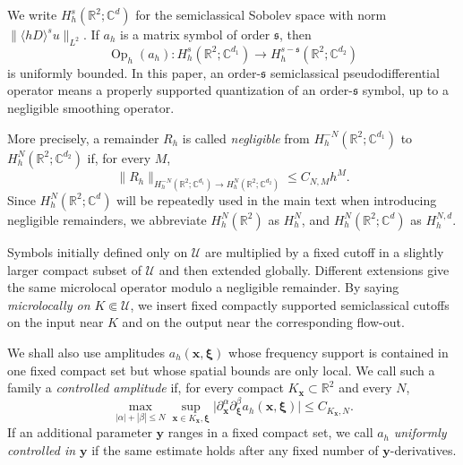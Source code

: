 \documentclass[11pt,reqno]{amsart}
\newcommand{\Op}{\operatorname{Op}}
\numberwithin{equation}{section}
\begin{document}
\begin{appendix}
We write $H_h^s(\mathbb R^2;\mathbb C^d)$ for the semiclassical Sobolev space with norm $\|\langle hD\rangle^su\|_{L^2}$. If $a_h$ is a matrix symbol of order $\mathfrak s$, then
\begin{equation*}
    \Op_h(a_h):H_h^s(\mathbb R^2;\mathbb C^{d_1})
    \longrightarrow H_h^{s-\mathfrak s}(\mathbb R^2;\mathbb C^{d_2})
\end{equation*}
is uniformly bounded. In this paper, an order-$\mathfrak s$ semiclassical pseudodifferential operator means a properly supported quantization of an order-$\mathfrak s$ symbol, up to a negligible smoothing operator.

More precisely, a remainder $R_h$ is called \emph{negligible} from $H_h^{-N}(\mathbb R^2;\mathbb C^{d_1})$ to $H_h^N(\mathbb R^2;\mathbb C^{d_2})$ if, for every $M$,
\begin{equation*}
 \|R_h\|_{H_h^{-N}(\mathbb R^2;\mathbb C^{d_1})
 \to H_h^N(\mathbb R^2;\mathbb C^{d_2})}
 \le C_{N,M}h^M.
\end{equation*}
Since $H_h^N(\mathbb{R}^2;\mathbb{C}^d)$ will be repeatedly used in the main text when introducing negligible remainders, we abbreviate $H_h^N(\mathbb{R}^2)$ as $H_h^N$, and $H_h^N(\mathbb R^2; \mathbb C^d)$ as $H_h^{N,d}$. 

Symbols initially defined only on $\mathcal U$ are multiplied by a fixed cutoff in a slightly larger compact subset of $\mathcal U$ and then extended globally. Different extensions give the same microlocal operator modulo a negligible remainder. By saying \emph{microlocally on $K\Subset\mathcal U$}, we insert fixed compactly supported semiclassical cutoffs on the input near $K$ and on the output near the corresponding flow-out.

We shall also use amplitudes $a_h(\bm x,\bm\xi)$ whose frequency support is contained in one fixed compact set but whose spatial bounds are only local. We call such a family a \emph{controlled amplitude} if, for every compact $K_{\bm x}\subset\mathbb R^2$ and every $N$,
\begin{equation*}
 \max_{|\alpha|+|\beta|\le N}\sup_{\bm x\in K_{\bm x},\bm\xi}\bigl|\partial_{\bm x}^{\alpha}\partial_{\bm\xi}^{\beta}a_h(\bm x,\bm\xi)\bigr|\le C_{K_{\bm x},N}.
\end{equation*}
If an additional parameter $\bm y$ ranges in a fixed compact set, we call $a_h$ \emph{uniformly controlled in $\bm y$} if the same estimate holds after any fixed number of $\bm y$-derivatives.


\end{appendix}
\end{document}
